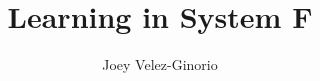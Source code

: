 \documentclass[11pt]{ociamthesis}
\title{Learning in System F}   %
\author{Joey Velez-Ginorio}             %
\theoremstyle{mytheoremstyle}
\begin{document}
\setcounter{secnumdepth}{3}
\setcounter{tocdepth}{3}

\maketitle                  %


\begin{romanpages}          %

\begin{singlespace}
\tableofcontents            %
\end{singlespace}

\end{romanpages}            %








\appendix



\begin{singlespace}
\end{singlespace}
\end{document}
